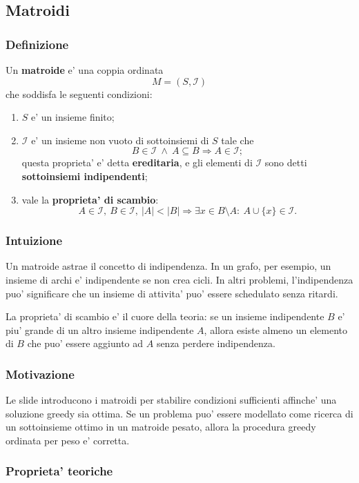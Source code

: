 \subsection{Matroidi}

\subsubsection{Definizione}
Un \textbf{matroide} e' una coppia ordinata
\[
M=(S,\mathcal{I})
\]
che soddisfa le seguenti condizioni:
\begin{enumerate}
	\item $S$ e' un insieme finito;
	\item $\mathcal{I}$ e' un insieme non vuoto di sottoinsiemi di $S$ tale che
	\[
	B\in\mathcal{I}\ \land\ A\subseteq B \Longrightarrow A\in\mathcal{I};
	\]
	questa proprieta' e' detta \textbf{ereditaria}, e gli elementi di $\mathcal{I}$ sono detti \textbf{sottoinsiemi indipendenti};
	\item vale la \textbf{proprieta' di scambio}:
	\[
	A\in\mathcal{I},\ B\in\mathcal{I},\ |A|<|B|
	\Longrightarrow
	\exists x\in B\setminus A:\ A\cup\{x\}\in\mathcal{I}.
	\]
\end{enumerate}

\subsubsection{Intuizione}
Un matroide astrae il concetto di indipendenza. In un grafo, per esempio, un insieme di archi e' indipendente se non crea cicli. In altri problemi, l'indipendenza puo' significare che un insieme di attivita' puo' essere schedulato senza ritardi.

La proprieta' di scambio e' il cuore della teoria: se un insieme indipendente $B$ e' piu' grande di un altro insieme indipendente $A$, allora esiste almeno un elemento di $B$ che puo' essere aggiunto ad $A$ senza perdere indipendenza.

\subsubsection{Motivazione}
Le slide introducono i matroidi per stabilire condizioni sufficienti affinche' una soluzione greedy sia ottima. Se un problema puo' essere modellato come ricerca di un sottoinsieme ottimo in un matroide pesato, allora la procedura greedy ordinata per peso e' corretta.

\subsubsection{Proprieta' teoriche}

